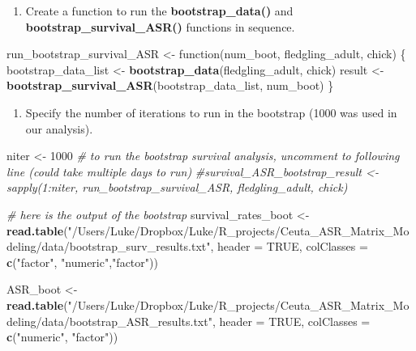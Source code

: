 \documentclass[]{article}
\newenvironment{Shaded}{\begin{snugshade}}{\end{snugshade}}
\newcommand{\KeywordTok}[1]{\textcolor[rgb]{0.13,0.29,0.53}{\textbf{{#1}}}}
\newcommand{\DataTypeTok}[1]{\textcolor[rgb]{0.13,0.29,0.53}{{#1}}}
\newcommand{\DecValTok}[1]{\textcolor[rgb]{0.00,0.00,0.81}{{#1}}}
\newcommand{\StringTok}[1]{\textcolor[rgb]{0.31,0.60,0.02}{{#1}}}
\newcommand{\CommentTok}[1]{\textcolor[rgb]{0.56,0.35,0.01}{\textit{{#1}}}}
\newcommand{\OtherTok}[1]{\textcolor[rgb]{0.56,0.35,0.01}{{#1}}}
\newcommand{\NormalTok}[1]{{#1}}
\providecommand{\tightlist}{%
  \setlength{\itemsep}{0pt}\setlength{\parskip}{0pt}}
\begin{document}
\begin{enumerate}
\def\labelenumi{\arabic{enumi})}
\setcounter{enumi}{2}
\tightlist
\item
  Create a function to run the \textbf{bootstrap\_data()} and
  \textbf{bootstrap\_survival\_ASR()} functions in sequence.
\end{enumerate}

\begin{Shaded}
\begin{Highlighting}[]
\NormalTok{run_bootstrap_survival_ASR <-}\StringTok{ }\NormalTok{function(num_boot, fledgling_adult, chick)}
  \NormalTok{\{}
  \NormalTok{bootstrap_data_list <-}\StringTok{ }\KeywordTok{bootstrap_data}\NormalTok{(fledgling_adult, chick)}
  \NormalTok{result <-}\StringTok{ }\KeywordTok{bootstrap_survival_ASR}\NormalTok{(bootstrap_data_list, num_boot)}
\NormalTok{\}}
\end{Highlighting}
\end{Shaded}

\begin{enumerate}
\def\labelenumi{\arabic{enumi})}
\setcounter{enumi}{3}
\tightlist
\item
  Specify the number of iterations to run in the bootstrap (1000 was
  used in our analysis).
\end{enumerate}

\begin{Shaded}
\begin{Highlighting}[]
\NormalTok{niter <-}\StringTok{ }\DecValTok{1000}
\CommentTok{# to run the bootstrap survival analysis, uncomment to following line (could take multiple days to run)}
\CommentTok{#survival_ASR_bootstrap_result <- sapply(1:niter, run_bootstrap_survival_ASR, fledgling_adult, chick)}

\CommentTok{# here is the output of the bootstrap}
\NormalTok{survival_rates_boot <-}\StringTok{ }
\StringTok{  }\KeywordTok{read.table}\NormalTok{(}\StringTok{"/Users/Luke/Dropbox/Luke/R_projects/Ceuta_ASR_Matrix_Modeling/data/bootstrap_surv_results.txt"}\NormalTok{,}
             \DataTypeTok{header =} \OtherTok{TRUE}\NormalTok{, }\DataTypeTok{colClasses =} \KeywordTok{c}\NormalTok{(}\StringTok{"factor"}\NormalTok{, }\StringTok{"numeric"}\NormalTok{,}\StringTok{"factor"}\NormalTok{))}

\NormalTok{ASR_boot <-}\StringTok{ }
\StringTok{  }\KeywordTok{read.table}\NormalTok{(}\StringTok{"/Users/Luke/Dropbox/Luke/R_projects/Ceuta_ASR_Matrix_Modeling/data/bootstrap_ASR_results.txt"}\NormalTok{, }
             \DataTypeTok{header =} \OtherTok{TRUE}\NormalTok{, }\DataTypeTok{colClasses =} \KeywordTok{c}\NormalTok{(}\StringTok{"numeric"}\NormalTok{, }\StringTok{"factor"}\NormalTok{))}
\end{Highlighting}
\end{Shaded}
\end{document}
